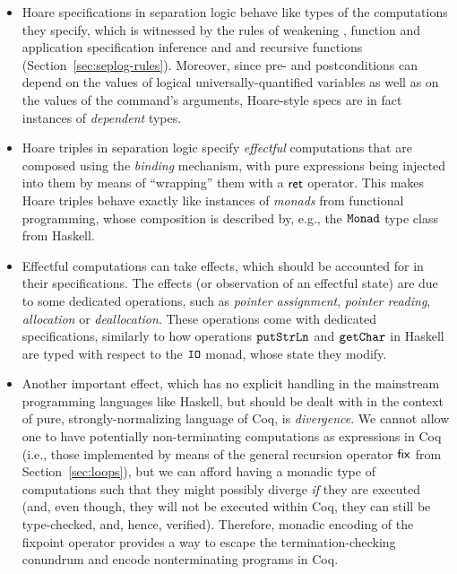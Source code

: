 \begin{itemize}
\item  Hoare specifications in separation logic behave like types of the
  computations they specify, which is witnessed by the rules of
  weakening , function and application specification
  inference  and  and recursive functions
   (Section~\ref{sec:seplog-rules}). Moreover, since
  pre- and postconditions can depend on the values of logical
  universally-quantified variables as well as on the values of the
  command's arguments, Hoare-style specs are in fact instances of
  \textit{dependent} types.

\item  Hoare triples in separation logic specify \textit{effectful} computations
  that are composed using the \textit{binding} mechanism, with pure
  expressions being injected into them by means of ``wrapping'' them
  with a $\mathsf{ret}$ operator. This makes Hoare triples behave exactly like
  instances of \textit{monads} from functional programming, whose composition
  is described by, e.g., the $\mathtt{Monad}$ type class from Haskell.

\item  Effectful computations can take effects, which should be accounted
  for in their specifications. The effects (or observation of an
  effectful state) are due to some dedicated operations, such as
  \textit{pointer assignment}, \textit{pointer reading}, \textit{allocation} or
  \textit{deallocation}. These operations come with dedicated specifications,
  similarly to how operations $\mathtt{putStrLn}$ and $\mathtt{getChar}$ in
  Haskell are typed with respect to the $\mathtt{IO}$ monad, whose state
  they modify.

\item  Another important effect, which has no explicit handling in the
  mainstream programming languages like Haskell, but should be dealt
  with in the context of pure, strongly-normalizing language of Coq,
  is \textit{divergence}. We cannot allow one to have potentially
  non-terminating computations as expressions in Coq (i.e., those
  implemented by means of the general recursion operator $\mathsf{fix}$ from
  Section~\ref{sec:loops}), but we can afford having a monadic type
  of computations such that they might possibly diverge \textit{if} they are
  executed (and, even though, they will not be executed within Coq,
  they can still be type-checked, and, hence, verified). Therefore,
  monadic encoding of the fixpoint operator provides a way to escape
  the termination-checking conundrum and encode nonterminating
  programs in Coq.

\end{itemize}
